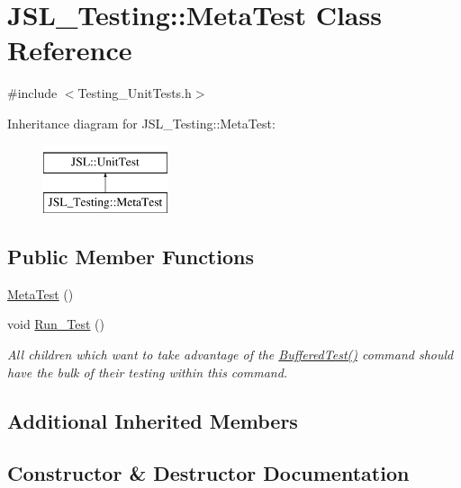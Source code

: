 \hypertarget{classJSL__Testing_1_1MetaTest}{}\section{J\+S\+L\+\_\+\+Testing\+:\+:Meta\+Test Class Reference}
\label{classJSL__Testing_1_1MetaTest}


{\ttfamily \#include $<$Testing\+\_\+\+Unit\+Tests.\+h$>$}

Inheritance diagram for J\+S\+L\+\_\+\+Testing\+:\+:Meta\+Test\+:\begin{figure}[H]
\begin{center}
\leavevmode
\includegraphics[height=2.000000cm]{classJSL__Testing_1_1MetaTest}
\end{center}
\end{figure}
\subsection*{Public Member Functions}
\begin{DoxyCompactItemize}
\item 
\hyperlink{classJSL__Testing_1_1MetaTest_a17efe6a92ae4934828a61d9f1120e67d}{Meta\+Test} ()
\item 
void \hyperlink{classJSL__Testing_1_1MetaTest_a176352dcd54f9ec7df8f1548882e6820}{Run\+\_\+\+Test} ()
\begin{DoxyCompactList}\small\item\em All children which want to take advantage of the \hyperlink{classJSL_1_1UnitTest_aabec19b081be8a428f12e4b5e3dc2a9c}{Buffered\+Test()} command should have the bulk of their testing within this command. \end{DoxyCompactList}\end{DoxyCompactItemize}
\subsection*{Additional Inherited Members}


\subsection{Constructor \& Destructor Documentation}
\mbox{\label{classJSL__Testing_1_1MetaTest_a17efe6a92ae4934828a61d9f1120e67d}} 
